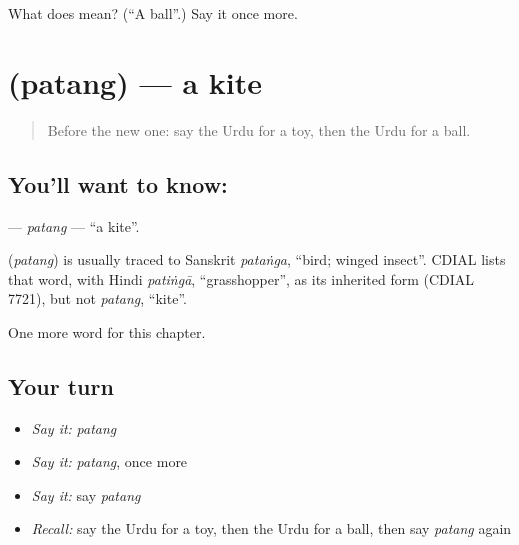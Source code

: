 \begin{tcolorbox}[breakable,colback=teal!4,colframe=teal!35!black,title={Before you move on}]
What does  mean? (\textquotedblleft{}A ball\textquotedblright{}.) Say it once more.
\end{tcolorbox}
\section[\texorpdfstring{\ur{پتنگ} (patang)}{پتنگ (patang)}]{ (patang) — a kite}

\label{lesson:UR-C112-patang}



\begin{quote}
Before the new one: say the Urdu for a toy, then the Urdu for a ball.
\end{quote}

\subsection*{You'll want to know: }
\textbf{} — \emph{patang} — \textquotedblleft{}a kite\textquotedblright{}.

\begin{cousinweb}
\textbf{} (\emph{patang}) is usually traced to Sanskrit \emph{pataṅga}, \textquotedblleft{}bird; winged insect\textquotedblright{}. CDIAL lists that word, with Hindi \emph{patiṅgā}, \textquotedblleft{}grasshopper\textquotedblright{}, as its inherited form (CDIAL 7721), but not \emph{patang}, \textquotedblleft{}kite\textquotedblright{}.
\end{cousinweb}

\begin{grammarlens}[title={What you've built}]
One more word for this chapter.
\end{grammarlens}

\subsection*{Your turn}
\begin{itemize}
\raggedright
  \item \emph{Say it:} \emph{patang}
  \item \emph{Say it:} \emph{patang}, once more
  \item \emph{Say it:} say \emph{patang}
  \item \emph{Recall:} say the Urdu for a toy, then the Urdu for a ball, then say \emph{patang} again
\end{itemize}


